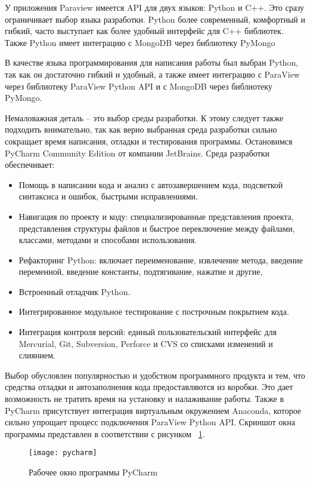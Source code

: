 \documentclass[14pt]{extreport}
\begin{document}
У приложения Paraview имеется API для двух языков: Python и C++. Это сразу ограничивает выбор языка разработки. Python более современный, комфортный и гибкий, часто выступает как более удобный интерфейс для C++ библиотек. Также Python имеет интеграцию с MongoDB через библиотеку PyMongo


В качестве языка программирования для написания работы был выбран Python, так как он достаточно гибкий и удобный, а также имеет интеграцию с ParaView через библиотеку ParaView Python API и с MongoDB через библиотеку PyMongo.

Немаловажная деталь -- это выбор среды разработки. К этому следует также подходить внимательно, так как верно выбранная среда разработки сильно сокращает время написания, отладки и тестирования программы. Остановимся PyCharm Community Edition от компании JetBrains.
Среда разработки обеспечивает:
\begin{itemize}
\item Помощь в написании кода и анализ с автозавершением кода, подсветкой синтаксиса и ошибок, быстрыми исправлениями.
\item Навигация по проекту и коду: специализированные представления проекта, представления структуры файлов и быстрое переключение между файлами, классами, методами и способами использования.
\item Рефакторинг Python: включает переименование, извлечение метода, введение переменной, введение константы, подтягивание, нажатие и другие,
\item Встроенный отладчик Python.
\item Интегрированное модульное тестирование с построчным покрытием кода.
\item Интеграция контроля версий: единый пользовательский интерфейс для Mercurial, Git, Subversion, Perforce и CVS со списками изменений и слиянием.
\end{itemize}

 Выбор обусловлен популярностью и удобством программного продукта и тем, что средства отладки и автозаполнения кода предоставляются из коробки. Это дает возможность не тратить время на установку и налаживание работы. Также в PyCharm присутствует интеграция виртуальным окружением Anaconda, которое сильно упрощает процесс подключения ParaView Python API.
Скриншот окна программы представлен в соответствии с рисунком ~\ref{fig12}.
\begin{figure}[H]
	\centerline{\texttt{[image: pycharm]}}
	\caption{Рабочее окно программы PyCharm}
	\label{fig12}
\end{figure}
\end{document}
